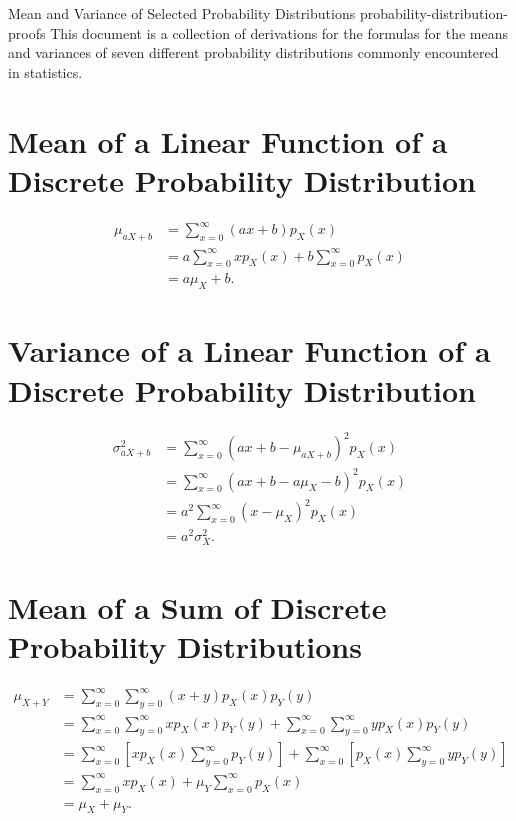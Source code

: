 \documentclass{myart}
\newcommand{\mean}{\mu}
\newcommand{\variance}{\sigma^2}
\begin{document}
\titlepage
{Mean and Variance of Selected Probability Distributions}
{probability-distribution-proofs}
{This document is a collection of derivations for the formulas for the
  means and variances of seven different probability distributions
  commonly encountered in statistics.}

\section{Mean of a Linear Function of a Discrete Probability
  Distribution}

\begin{align*}
   \mean_{aX+b}
&= \sum_{x=0}^\infty (ax + b) p_X(x) \\
&= a \sum_{x=0}^\infty x p_X(x) + b \sum_{x=0}^\infty p_X(x) \\
&= a \mean_X + b.
\end{align*}

\section{Variance of a Linear Function of a Discrete Probability
  Distribution}

\begin{align*}
   \variance_{aX+b}
&= \sum_{x=0}^\infty (ax + b - \mean_{aX+b})^2 p_X(x) \\
&= \sum_{x=0}^\infty (ax + b - a \mean_X - b)^2 p_X(x) \\
&= a^2 \sum_{x=0}^\infty (x - \mean_X)^2 p_X(x) \\
&= a^2 \variance_X.
\end{align*}

\section{Mean of a Sum of Discrete Probability Distributions}

\begin{align*}
   \mean_{X+Y}
&= \sum_{x=0}^\infty \sum_{y=0}^\infty (x + y) p_X(x) p_Y(y) \\
&= \sum_{x=0}^\infty \sum_{y=0}^\infty x p_X(x) p_Y(y)
   + \sum_{x=0}^\infty \sum_{y=0}^\infty y p_X(x) p_Y(y) \\
&= \sum_{x=0}^\infty \left[x p_X(x) \sum_{y=0}^\infty p_Y(y)\right]
   + \sum_{x=0}^\infty
       \left[p_X(x) \sum_{y=0}^\infty y p_Y(y)\right] \\
&= \sum_{x=0}^\infty x p_X(x) + \mean_Y \sum_{x=0}^\infty p_X(x) \\
&= \mean_X + \mean_Y.
\end{align*}
\end{document}
